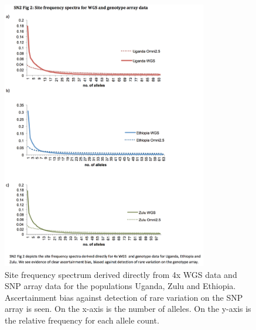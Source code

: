 \begin{figure}
\centering
\includegraphics[trim={0 2cm 4cm 1cm},clip,width=0.8\textwidth]{fig/SN02f2}
\caption[Site frequency spectrum of sequence and SNP array data]{Site frequency spectrum derived directly from 4x \gls{WGS} data and SNP array data for the populations Uganda, Zulu and Ethiopia. Ascertainment bias against detection of rare variation on the SNP array is seen. On the x-axis is the number of alleles. On the y-axis is the relative frequency for each allele count.}
\label{fig:SN02f2}
\end{figure}